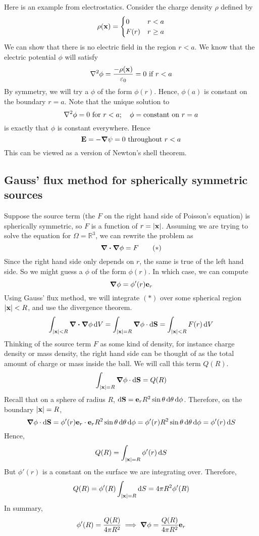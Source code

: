 \begin{example}
	Here is an example from electrostatics.
	Consider the charge density \(\rho\) defined by
	\[
		\rho(\vb x) = \begin{cases}
			0    & r < a    \\
			F(r) & r \geq a
		\end{cases}
	\]
	We can show that there is no electric field in the region \(r < a\).
	We know that the electric potential \(\phi\) will satisfy
	\[
		\laplacian{\phi} = \frac{-\rho(\vb x)}{\varepsilon_0} = 0 \text{ if } r<a
	\]
	By symmetry, we will try a \(\phi\) of the form \(\phi(r)\).
	Hence, \(\phi(a)\) is constant on the boundary \(r=a\).
	Note that the unique solution to
	\[
		\laplacian{\phi} = 0 \text{ for } r<a;\quad \phi = \text{constant on } r = a
	\]
	is exactly that \(\phi\) is constant everywhere.
	Hence
	\[
		\vb E = -\grad{\psi} = 0 \text{ throughout } r<a
	\]
	This can be viewed as a version of Newton's shell theorem.
\end{example}

\subsection{Gauss' flux method for spherically symmetric sources}
Suppose the source term (the \(F\) on the right hand side of Poisson's equation) is spherically symmetric, so \(F\) is a function of \(r = \abs{\vb x}\).
Assuming we are trying to solve the equation for \(\Omega = \mathbb R^3\), we can rewrite the problem as
\begin{equation}
	\div{\grad{\phi}} = F
	\tag{\(\ast\)}
\end{equation}
Since the right hand side only depends on \(r\), the same is true of the left hand side.
So we might guess a \(\phi\) of the form \(\phi(r)\).
In which case, we can compute
\[
	\grad{\phi} = \phi'(r) \vb e_r
\]
Using Gauss' flux method, we will integrate \((\ast)\) over some spherical region \(\abs{\vb x} < R\), and use the divergence theorem.
\[
	\int_{\abs{\vb x} < R} \div{\grad{\phi}}\dd{V} = \int_{\abs{\vb x} = R} \grad{\phi} \cdot \dd{\vb S} = \int_{\abs{\vb x} < R} F(r) \dd{V}
\]
Thinking of the source term \(F\) as some kind of density, for instance charge density or mass density, the right hand side can be thought of as the total amount of charge or mass inside the ball.
We will call this term \(Q(R)\).
\[
	\int_{\abs{\vb x} = R} \grad{\phi} \cdot \dd{\vb S} = Q(R)
\]
Recall that on a sphere of radius \(R\), \(\dd{\vb S} = \vb e_r R^2 \sin\theta \dd{\theta}\dd{\phi}\).
Therefore, on the boundary \(\abs{\vb x} = R\),
\[
	\grad{\phi} \cdot \dd{\vb S} = \phi'(r) \vb e_r \cdot \vb e_r R^2 \sin\theta \dd{\theta}\dd{\phi} = \phi'(r) R^2 \sin\theta \dd{\theta}\dd{\phi} = \phi'(r) \dd{S}
\]
Hence,
\[
	Q(R) = \int_{\abs{\vb x} = R} \phi'(r) \dd{S}
\]
But \(\phi'(r)\) is a constant on the surface we are integrating over.
Therefore,
\[
	Q(R) = \phi'(R) \int_{\abs{\vb x} = R} \dd{S} = 4\pi R^2 \phi'(R)
\]
In summary,
\[
	\phi'(R) = \frac{Q(R)}{4\pi R^2} \implies \grad{\phi} = \frac{Q(R)}{4\pi R^2} \vb e_r
\]

